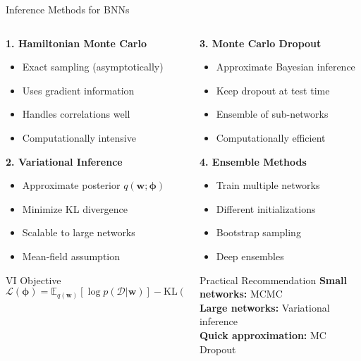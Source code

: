 \documentclass[aspectratio=169,11pt]{beamer}
\newcommand{\E}{\mathbb{E}}
\newcommand{\KL}{\text{KL}}
\newcommand{\bw}{\mathbf{w}}
\begin{document}
\begin{frame}{Inference Methods for BNNs}
\begin{columns}
\begin{column}{0.5\textwidth}
\textbf{1. Hamiltonian Monte Carlo}
\begin{itemize}
\item \textcolor{forest}{Exact sampling} (asymptotically)
\item Uses gradient information
\item Handles correlations well
\item Computationally intensive
\end{itemize}

\textbf{2. Variational Inference}
\begin{itemize}
\item Approximate posterior $q(\bw; \boldsymbol{\phi})$
\item Minimize KL divergence
\item Scalable to large networks
\item Mean-field assumption
\end{itemize}

\begin{block}{VI Objective}
\[\mathcal{L}(\boldsymbol{\phi}) = \E_{q(\bw)}[\log p(\mathcal{D}|\bw)] - \KL(q(\bw) \| p(\bw))\]
\end{block}
\end{column}
\begin{column}{0.5\textwidth}
\textbf{3. Monte Carlo Dropout}
\begin{itemize}
\item Approximate Bayesian inference
\item Keep dropout at test time
\item Ensemble of sub-networks
\item Computationally efficient
\end{itemize}

\textbf{4. Ensemble Methods}
\begin{itemize}
\item Train multiple networks
\item Different initializations
\item Bootstrap sampling
\item Deep ensembles
\end{itemize}

\begin{alertblock}{Practical Recommendation}
\textbf{Small networks:} MCMC\\
\textbf{Large networks:} Variational inference\\
\textbf{Quick approximation:} MC Dropout
\end{alertblock}
\end{column}
\end{columns}
\end{frame}
\end{document}
